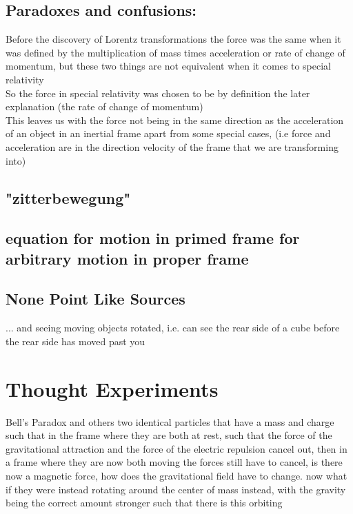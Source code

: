 \section{Paradoxes and confusions:}

Before the discovery of Lorentz transformations the force was the same when it was defined by the multiplication of mass times acceleration or rate of change of momentum, but these two things are not equivalent when it comes to special relativity\\
So the force in special relativity was chosen to be by definition the later explanation (the rate of change of momentum)\\
This leaves us with the force not being in the same direction as the acceleration of an object in an inertial frame apart from some special cases, (i.e force and acceleration are in the direction velocity of the frame that we are transforming into)


\section{"zitterbewegung"} \label{ch: "zitterbewegung"}

\section{equation for motion in primed frame for arbitrary motion in proper frame} \label{ch: equation for motion in primed frame for arbitrary motion in proper frame}

\section{None Point Like Sources} \label{ch: None Point Like Sources}
... and seeing moving objects rotated, i.e. can see the rear side of a cube before the rear side has moved past you

\chapter{Thought Experiments} \label{ch: Thought Experiments}
Bell's Paradox and others
two identical particles that have a mass and charge such that in the frame where they are both at rest, such that the force of the gravitational attraction and the force of the electric repulsion cancel out, then in a frame where they are now both moving the forces still have to cancel, is there now a magnetic force, how does the gravitational field have to change. now what if they were instead rotating around the center of mass instead, with the gravity being the correct amount stronger such that there is this orbiting

